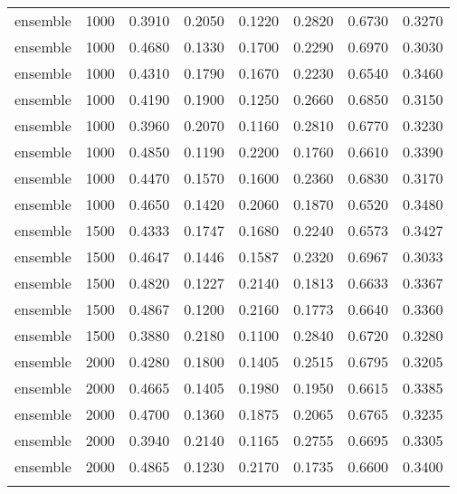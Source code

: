 \begin{scriptsize}
\begin{longtable}{cccccccc}
		ensemble & 1000 & 0.3910 & 0.2050 & 0.1220 & 0.2820 & 0.6730 & 0.3270 \\
		ensemble & 1000 & 0.4680 & 0.1330 & 0.1700 & 0.2290 & 0.6970 & 0.3030 \\
		ensemble & 1000 & 0.4310 & 0.1790 & 0.1670 & 0.2230 & 0.6540 & 0.3460 \\
		ensemble & 1000 & 0.4190 & 0.1900 & 0.1250 & 0.2660 & 0.6850 & 0.3150 \\
		ensemble & 1000 & 0.3960 & 0.2070 & 0.1160 & 0.2810 & 0.6770 & 0.3230 \\
		ensemble & 1000 & 0.4850 & 0.1190 & 0.2200 & 0.1760 & 0.6610 & 0.3390 \\
		ensemble & 1000 & 0.4470 & 0.1570 & 0.1600 & 0.2360 & 0.6830 & 0.3170 \\
		ensemble & 1000 & 0.4650 & 0.1420 & 0.2060 & 0.1870 & 0.6520 & 0.3480 \\
		ensemble & 1500 & 0.4333 & 0.1747 & 0.1680 & 0.2240 & 0.6573 & 0.3427 \\
		ensemble & 1500 & 0.4647 & 0.1446 & 0.1587 & 0.2320 & 0.6967 & 0.3033 \\
		ensemble & 1500 & 0.4820 & 0.1227 & 0.2140 & 0.1813 & 0.6633 & 0.3367 \\
		ensemble & 1500 & 0.4867 & 0.1200 & 0.2160 & 0.1773 & 0.6640 & 0.3360 \\
		ensemble & 1500 & 0.3880 & 0.2180 & 0.1100 & 0.2840 & 0.6720 & 0.3280 \\
		ensemble & 2000 & 0.4280 & 0.1800 & 0.1405 & 0.2515 & 0.6795 & 0.3205 \\
		ensemble & 2000 & 0.4665 & 0.1405 & 0.1980 & 0.1950 & 0.6615 & 0.3385 \\
		ensemble & 2000 & 0.4700 & 0.1360 & 0.1875 & 0.2065 & 0.6765 & 0.3235 \\
		ensemble & 2000 & 0.3940 & 0.2140 & 0.1165 & 0.2755 & 0.6695 & 0.3305 \\
		ensemble & 2000 & 0.4865 & 0.1230 & 0.2170 & 0.1735 & 0.6600 & 0.3400 \\
		\bottomrule
		\label{tab:anexo-confusion}
	\end{longtable}
\end{scriptsize}

